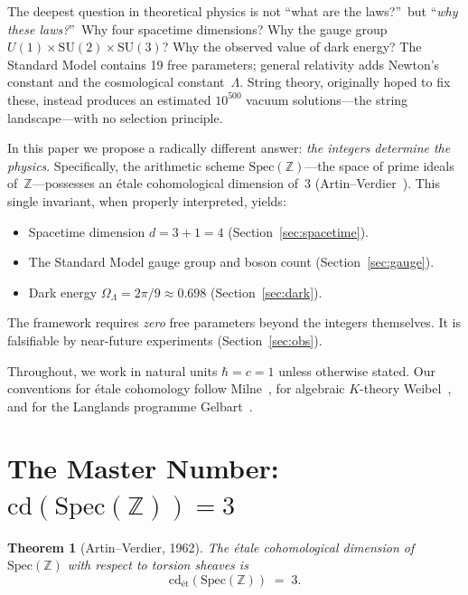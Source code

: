 \documentclass[12pt,a4paper]{article}
\newtheorem{theorem}{Theorem}[section]
\theoremstyle{definition}
\newcommand{\Spec}{\mathrm{Spec}}
\newcommand{\cd}{\mathrm{cd}}
\newcommand{\SU}{\mathrm{SU}}
\newcommand{\Z}{\mathbb{Z}}
\newcommand{\OmL}{\Omega_\Lambda}
\begin{document}
The deepest question in theoretical physics is not ``what are the laws?''\ but
``\emph{why these laws?}''\ Why four spacetime dimensions?  Why the gauge group
$U(1)\times\SU(2)\times\SU(3)$?  Why the observed value of dark energy?
The Standard Model contains 19 free parameters; general relativity adds Newton's
constant and the cosmological constant~$\Lambda$.  String theory, originally hoped
to fix these, instead produces an estimated $10^{500}$ vacuum solutions---the
string landscape---with no selection principle.

In this paper we propose a radically different answer: \emph{the integers determine
the physics}.  Specifically, the arithmetic scheme $\Spec(\Z)$---the space of prime
ideals of~$\Z$---possesses an \'etale cohomological dimension of~$3$
(Artin--Verdier~\cite{ArtinVerdier}).  This single invariant, when properly interpreted,
yields:

\begin{itemize}
\item Spacetime dimension $d=3+1=4$ (Section~\ref{sec:spacetime}).
\item The Standard Model gauge group and boson count (Section~\ref{sec:gauge}).
\item Dark energy $\OmL=2\pi/9\approx 0.698$ (Section~\ref{sec:dark}).
\end{itemize}

The framework requires \emph{zero} free parameters beyond the integers themselves.
It is falsifiable by near-future experiments (Section~\ref{sec:obs}).

Throughout, we work in natural units $\hbar=c=1$ unless otherwise stated.
Our conventions for \'etale cohomology follow Milne~\cite{Milne},
for algebraic $K$-theory Weibel~\cite{Weibel}, and for the Langlands programme
Gelbart~\cite{Gelbart}.

\section{The Master Number: $\cd(\Spec(\Z))=3$}\label{sec:cd3}

\begin{theorem}[Artin--Verdier, 1962]\label{thm:AV}
The \'etale cohomological dimension of~$\Spec(\Z)$ with respect to torsion sheaves is
\[
  \cd_{\text{\'et}}(\Spec(\Z)) \;=\; 3.
\]
\end{theorem}
\end{document}
